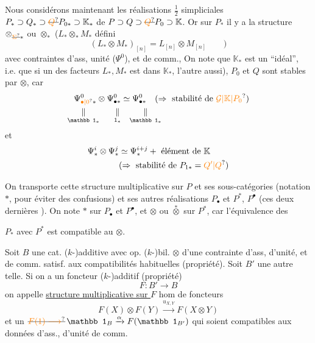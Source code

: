 Nous considérons maintenant les réalisations $\frac12$ simpliciales $P_*\supset Q_*\supset \deleted{\unsure{Q}}P_{0*}\supset \mathbb{K}_*$  de $P\supset Q\supset \deleted{\unsure{Q}}P_0\supset\mathbb{K}$. Or sur  $P_*$ il y a la structure $\otimes_{\deleted{\unsure{\Sigma}}*}$ ou $\otimes_*$ ($L_*\otimes_*M_*$ défini 
\[
(L_*\otimes M_*)_{[n]}=L_{[n]}\otimes M_{[n]}\qquad)
\]
avec contraintes d'ass, unité ($\Psi^0$), et de comm.,   On note que $\mathbb{K}_*$ est un ``idéal'', i.e. que   si un des facteurs $L_*,M_*$ est dans $\mathbb{K}_*$, l'autre aussi), $P_0$ et $Q$ sont stables par $\otimes$, car
\[
\begin{aligned}
\Psi^0_{\unsure{\bullet|0}*}\otimes\Psi^0_{\bullet*}&\simeq\Psi^0_{\bullet*}\quad(\Rightarrow\text{ stabilité de }\unsure{\mathcal G|\mathbb{K}|P_0})\\[-.3ex]
\underset{\mathbb 1_*}{\Vert}\hspace{1.7em}\underset{1_*}{\Vert}&\hspace{1em}\underset{\mathbb 1_*}{\Vert}
\end{aligned}
\]
et
\[
\begin{aligned}
\Psi^i_*\otimes\Psi^j_*&\simeq\Psi^{i+j}_*+\text{ élément de }\mathbb{K}\\
&(\Rightarrow\text{ stabilité de }P_{1*}=\unsure{Q'|Q})
\end{aligned}
\]

On transporte cette structure multiplicative sur $P$ et ses sous-catégories (notation $*$, pour éviter des confusions) et ses autres réalisations $P_{\bullet}$ et $P^{*}$, $P^{\bullet}$ (ces deux dernières ). On note $*$ sur $P_{\bullet}$ et $P^{\bullet}$, et $\otimes$ ou $\overset{*}{\otimes}$ sur $P^{*}$, car l'équivalence des

$P_*$ avec $P^*$ est compatible au $\otimes$.

Soit $B$ une cat. ($k$-)additive avec op. ($k$-)bil. $\otimes$  \uline{} d'une contrainte d'ass, d'unité, et de comm.   satisf. aux compatibilités habituelles (propriété). Soit $B'$ une autre telle. Si on a un foncteur ($k$-)additif (propriété)
\[
F:B'\longrightarrow B
\]
on appelle \uline{structure multiplicative sur $F$}  hom de foncteurs
\[
F(X)\otimes F(Y)\xrightarrow{u_{X,Y}}F(X\otimes Y)
\]
et un  $\deleted{\unsure{F(1)\longrightarrow}}\,\mathbb 1_B\xrightarrow{\alpha}F(\mathbb 1_{B'})$ qui soient compatibles aux données d'ass., d'unité de comm.

